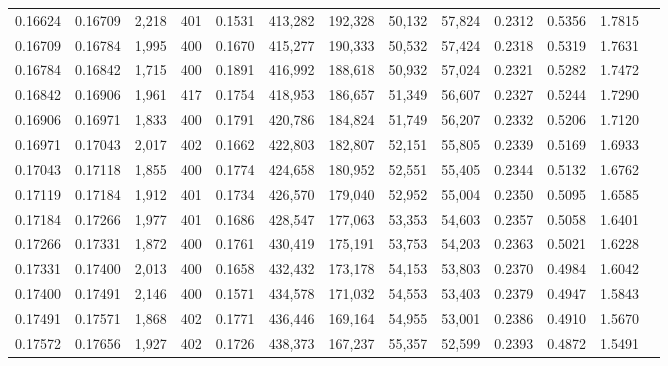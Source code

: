 \begin{tabular}{rrrrrrrrrrrrr}
0.16624 & 0.16709 & 2,218 & 401 &                                     0.1531 & 413,282 & 192,328 &  50,132 &  57,824 & 0.2312 & 0.5356 & 1.7815 \\
0.16709 & 0.16784 & 1,995 & 400 &                                     0.1670 & 415,277 & 190,333 &  50,532 &  57,424 & 0.2318 & 0.5319 & 1.7631 \\
0.16784 & 0.16842 & 1,715 & 400 &                                     0.1891 & 416,992 & 188,618 &  50,932 &  57,024 & 0.2321 & 0.5282 & 1.7472 \\
0.16842 & 0.16906 & 1,961 & 417 &                                     0.1754 & 418,953 & 186,657 &  51,349 &  56,607 & 0.2327 & 0.5244 & 1.7290 \\
0.16906 & 0.16971 & 1,833 & 400 &                                     0.1791 & 420,786 & 184,824 &  51,749 &  56,207 & 0.2332 & 0.5206 & 1.7120 \\
0.16971 & 0.17043 & 2,017 & 402 &                                     0.1662 & 422,803 & 182,807 &  52,151 &  55,805 & 0.2339 & 0.5169 & 1.6933 \\
0.17043 & 0.17118 & 1,855 & 400 &                                     0.1774 & 424,658 & 180,952 &  52,551 &  55,405 & 0.2344 & 0.5132 & 1.6762 \\
0.17119 & 0.17184 & 1,912 & 401 &                                     0.1734 & 426,570 & 179,040 &  52,952 &  55,004 & 0.2350 & 0.5095 & 1.6585 \\
0.17184 & 0.17266 & 1,977 & 401 &                                     0.1686 & 428,547 & 177,063 &  53,353 &  54,603 & 0.2357 & 0.5058 & 1.6401 \\
0.17266 & 0.17331 & 1,872 & 400 &                                     0.1761 & 430,419 & 175,191 &  53,753 &  54,203 & 0.2363 & 0.5021 & 1.6228 \\
0.17331 & 0.17400 & 2,013 & 400 &                                     0.1658 & 432,432 & 173,178 &  54,153 &  53,803 & 0.2370 & 0.4984 & 1.6042 \\
0.17400 & 0.17491 & 2,146 & 400 &                                     0.1571 & 434,578 & 171,032 &  54,553 &  53,403 & 0.2379 & 0.4947 & 1.5843 \\
0.17491 & 0.17571 & 1,868 & 402 &                                     0.1771 & 436,446 & 169,164 &  54,955 &  53,001 & 0.2386 & 0.4910 & 1.5670 \\
0.17572 & 0.17656 & 1,927 & 402 &                                     0.1726 & 438,373 & 167,237 &  55,357 &  52,599 & 0.2393 & 0.4872 & 1.5491 \\

\end{tabular}
